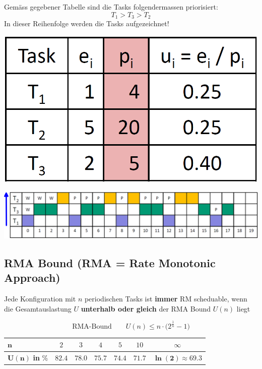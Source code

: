 
\begin{minipage}[t]{0.55\columnwidth}
    Gemäss gegebener Tabelle sind die Tasks folgendermassen priorisiert:
    $$ T_1 > T_3 > T_2 $$
    In dieser Reihenfolge werden die Tasks aufgezeichnet!
\end{minipage}
\hfill
\begin{minipage}[t]{0.38\columnwidth}
    \includegraphics[width=\columnwidth, align=t]{images/scheduling_RMS_example_tabelle.png}
\end{minipage}

\begin{center}
    \includegraphics[width=\columnwidth]{images/scheduling_RMS_example_schedule.png}
\end{center}


\subsection{RMA Bound (RMA = Rate Monotonic Approach)}

Jede Konfiguration mit $n$ periodischen Tasks ist \textbf{immer} RM scheduable, wenn die Gesamtauslastung $U$ 
\textbf{unterhalb oder gleich} der RMA Bound $U(n)$ liegt

$$ \text{RMA-Bound} \qquad U(n) \leq n \cdot \big( 2^{\frac{1}{n}} - 1 \big)  $$

\begin{center}
    \begin{tabular}{l cccccc}
        \toprule
        $\bm{n}$                    & $2$       & $3$       & $4$       & $5$       & $10$      & $\infty$                      \\
        \midrule
        $\bm{U(n)}$ \textbf{in} \%  & $82.4$    & $78.0$    & $75.7$    & $74.4$    & $71.7$    & $\bm{\ln(2) \approx 69.3}$    \\
        \bottomrule
    \end{tabular}
\end{center}

